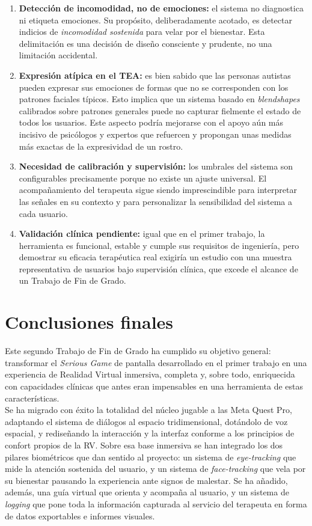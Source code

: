 \documentclass[12pt,twoside,titlepage]{report}
\begin{document}
\begin{enumerate}[label=\textbf{\arabic*.}, leftmargin=1.5cm, itemsep=0.5em]
  \item \textbf{Detección de incomodidad, no de emociones:} el sistema no diagnostica ni etiqueta emociones.
Su propósito, deliberadamente acotado, es detectar indicios de \textit{incomodidad sostenida} para velar por el bienestar.
Esta delimitación es una decisión de diseño consciente y prudente, no una limitación accidental.
  \item \textbf{Expresión atípica en el TEA:} es bien sabido que las personas autistas pueden expresar sus emociones de formas que no se corresponden con los patrones faciales típicos.
Esto implica que un sistema basado en \textit{blendshapes} calibrados sobre patrones generales puede no capturar fielmente el estado de todos los usuarios.
Este aspecto podría mejorarse con el apoyo aún más incisivo de psicólogos y expertos que refuercen y propongan unas medidas más exactas de la expresividad de un rostro.
  \item \textbf{Necesidad de calibración y supervisión:} los umbrales del sistema son configurables precisamente porque no existe un ajuste universal.
El acompañamiento del terapeuta sigue siendo imprescindible para interpretar las señales en su contexto y para personalizar la sensibilidad del sistema a cada usuario.
  \item \textbf{Validación clínica pendiente:} igual que en el primer trabajo, la herramienta es funcional, estable y cumple sus requisitos de ingeniería, pero demostrar su eficacia terapéutica real exigiría un estudio con una muestra representativa de usuarios bajo supervisión clínica, que excede el alcance de un Trabajo de Fin de Grado.
\end{enumerate}

\section{Conclusiones finales}

Este segundo Trabajo de Fin de Grado ha cumplido su objetivo general: transformar el \textit{Serious Game} de pantalla desarrollado en el primer trabajo en una experiencia de Realidad Virtual inmersiva, completa y, sobre todo, enriquecida con capacidades clínicas que antes eran impensables en una herramienta de estas características.\\

Se ha migrado con éxito la totalidad del núcleo jugable a las Meta Quest Pro, adaptando el sistema de diálogos al espacio tridimensional, dotándolo de voz espacial, y rediseñando la interacción y la interfaz conforme a los principios de confort propios de la RV.
Sobre esa base inmersiva se han integrado los dos pilares biométricos que dan sentido al proyecto: un sistema de \textit{eye-tracking} que mide la atención sostenida del usuario, y un sistema de \textit{face-tracking} que vela por su bienestar pausando la experiencia ante signos de malestar.
Se ha añadido, además, una guía virtual que orienta y acompaña al usuario, y un sistema de \textit{logging} que pone toda la información capturada al servicio del terapeuta en forma de datos exportables e informes visuales.\\
\end{document}

